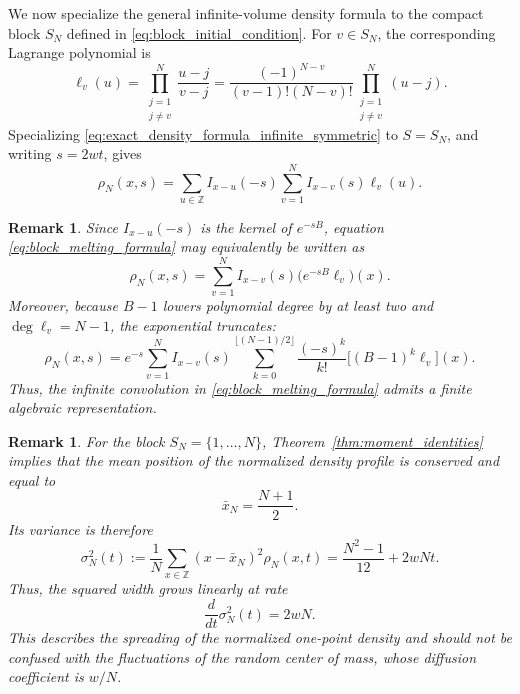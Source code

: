 \documentclass[11pt]{article}
\numberwithin{equation}{section}
\newtheorem{remark}[theorem]{Remark}
\newcommand{\1}{\mathbf 1}
\begin{document}
We now specialize the general infinite-volume density formula to the compact
block \(S_N\) defined in \eqref{eq:block_initial_condition}. For \(v\in S_N\),
the corresponding Lagrange polynomial is
\begin{equation}
    \ell_v(u)
    =
    \prod_{\substack{j=1\\j\neq v}}^N
    \frac{u-j}{v-j}
    =
    \frac{(-1)^{N-v}}{(v-1)!(N-v)!}
    \prod_{\substack{j=1\\j\neq v}}^N(u-j).
    \label{eq:block_lagrange_factor}
\end{equation}
Specializing
\eqref{eq:exact_density_formula_infinite_symmetric} to \(S=S_N\), and writing
\(s=2wt\), gives
\begin{equation}
    \rho_N(x,s)
    =
    \sum_{u\in\mathbb Z}I_{x-u}(-s)
    \sum_{v=1}^N I_{x-v}(s)\ell_v(u).
    \label{eq:block_melting_formula}
\end{equation}

\begin{remark}
Since \(I_{x-u}(-s)\) is the kernel of \(e^{-sB}\), equation
\eqref{eq:block_melting_formula} may equivalently be written as
\[
    \rho_N(x,s)
    =
    \sum_{v=1}^N
    I_{x-v}(s)\bigl(e^{-sB}\ell_v\bigr)(x).
\]
Moreover, because \(B-1\) lowers polynomial degree by at least two and
\(\deg\ell_v=N-1\), the exponential truncates:
\[
    \rho_N(x,s)
    =
    e^{-s}
    \sum_{v=1}^N I_{x-v}(s)
    \sum_{k=0}^{\lfloor(N-1)/2\rfloor}
    \frac{(-s)^k}{k!}
    \bigl[(B-1)^k\ell_v\bigr](x).
\]
Thus, the infinite convolution in \eqref{eq:block_melting_formula} admits a
finite algebraic representation.
\end{remark}

\begin{remark}
For the block \(S_N=\{1,\ldots,N\}\), Theorem~\ref{thm:moment_identities}
implies that the mean position of the normalized density profile is conserved
and equal to
\[
    \bar x_N=\frac{N+1}{2}.
\]
Its variance is therefore
\begin{equation}
    \sigma_N^2(t)
    :=
    \frac{1}{N}
    \sum_{x\in\mathbb Z}
    (x-\bar x_N)^2\rho_N(x,t)
    =
    \frac{N^2-1}{12}+2wNt.
    \label{eq:block_width_growth}
\end{equation}
Thus, the squared width grows linearly at rate
\[
    \frac{d}{dt}\sigma_N^2(t)=2wN.
\]
This describes the spreading of the normalized one-point density and should
not be confused with the fluctuations of the random center of mass, whose
diffusion coefficient is \(w/N\).
\end{remark}
\end{document}
